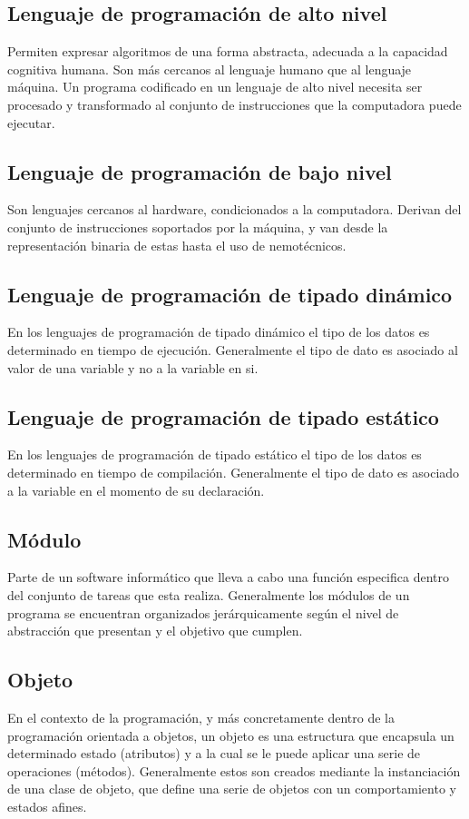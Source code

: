 \subsection{Lenguaje de programación de alto nivel}
Permiten expresar algoritmos de una forma abstracta, adecuada a la capacidad cognitiva humana. Son más cercanos
al lenguaje humano que al lenguaje máquina. Un programa codificado en un lenguaje de alto nivel necesita ser procesado 
y transformado al conjunto de instrucciones que la computadora puede ejecutar. 

\subsection{Lenguaje de programación de bajo nivel}
Son lenguajes cercanos al hardware, condicionados a la computadora. Derivan del conjunto de instrucciones 
soportados por la máquina, y van desde la representación binaria de estas hasta el uso de nemotécnicos.

\subsection{Lenguaje de programación de tipado dinámico}
En los lenguajes de programación de tipado dinámico el tipo de los datos es determinado en tiempo de ejecución. Generalmente el tipo de dato es asociado 
al valor de una variable y no a la variable en si. 
 
\subsection{Lenguaje de programación de tipado estático}
En los lenguajes de programación de tipado estático el tipo de los datos es determinado en tiempo de compilación. Generalmente el tipo de dato es asociado 
a la variable en el momento de su declaración.  

\subsection {Módulo}
Parte de un software informático que lleva a cabo una función especifica dentro del conjunto de tareas que esta realiza. Generalmente los módulos
de un programa se encuentran organizados jerárquicamente según el nivel de abstracción que presentan y el objetivo que cumplen.

\subsection {Objeto}
En el contexto de la programación, y más concretamente dentro de la programación orientada a objetos, un objeto es una estructura que encapsula un determinado estado (atributos) y a la 
cual se le puede aplicar una serie de operaciones (métodos). Generalmente estos son creados mediante la instanciación de una clase de objeto, que define una serie de objetos con un comportamiento y estados afines.


